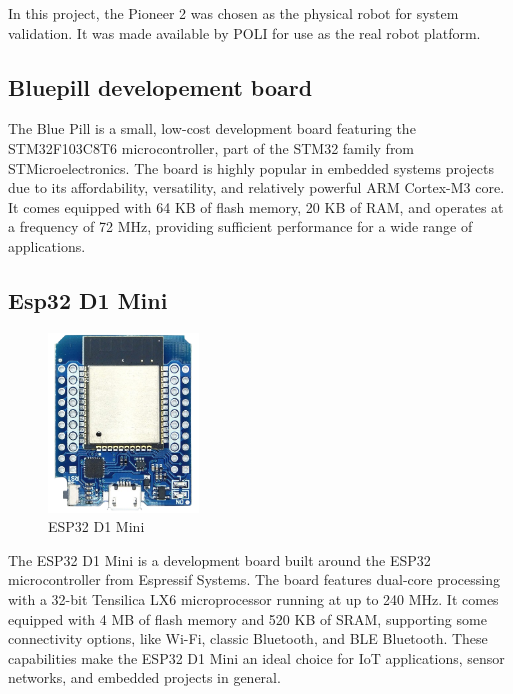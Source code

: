 \documentclass[../../monografia.tex]{subfiles}
\begin{document}
In this project, the Pioneer 2 was chosen as the physical robot for system validation. It was made available by POLI for use as the real robot platform.


\subsection{Bluepill developement board}

The Blue Pill is a small, low-cost development board featuring the STM32F103C8T6 microcontroller, part of the STM32 family from STMicroelectronics. The board is highly popular in embedded systems projects due to its affordability, versatility, and relatively powerful ARM Cortex-M3 core. It comes equipped with 64 KB of flash memory, 20 KB of RAM, and operates at a frequency of 72 MHz, providing sufficient performance for a wide range of applications.

\subsection{Esp32 D1 Mini}

\clearpage

\begin{figure}
    \centering
    \includegraphics[width=4cm]{esp32d1mini-removebg.png}
    \caption{ESP32 D1 Mini}
    \label{fig: ESP32 D1 mini}
\end{figure}

The ESP32 \cite{esp32_2024} D1 Mini is a development board built around the ESP32 microcontroller from Espressif Systems. The board features dual-core processing with a 32-bit Tensilica LX6 microprocessor running at up to 240 MHz. It comes equipped with 4 MB of flash memory and 520 KB of SRAM, supporting some connectivity options, like Wi-Fi, classic Bluetooth, and BLE Bluetooth. These capabilities make the ESP32 D1 Mini an ideal choice for IoT applications, sensor networks, and embedded projects in general.
\end{document}
